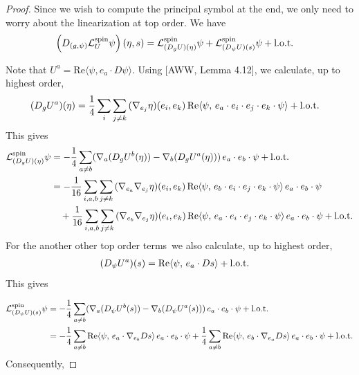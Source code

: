 \documentclass{amsart}
\theoremstyle{definition}
\theoremstyle{remark}
\numberwithin{equation}{section}
\newcommand{\lot}{\textup{l.o.t.}}
\begin{document}
\begin{proof}
	Since we wish to compute the principal symbol at the end, we only need to worry about the linearization at top order.	We have
	\begin{align}
		\left(D_{(g,\psi)}\mathcal{L}_{U}^{\text{spin}}\psi\right)(\eta,s) & = \mathcal{L}_{(D_g U)(\eta)}^{\text{spin}}\psi  + \mathcal{L}_{(D_\psi U)(s)}^{\text{spin}}\psi + \lot
	\end{align}
	
	Note that $U^a = \text{Re}\langle\psi, e_a\cdot D\psi\rangle $. 
	Using [AWW, Lemma 4.12], we calculate, up to highest order, 
	\begin{align}
		(D_g U^a)(\eta) &= \frac{1}{4}\sum_{i}\sum_{j\neq k}\, (\nabla_{e_j}\eta)(e_i, e_k)\, \textup{Re}\langle \psi,\, e_a\cdot e_i\cdot e_j\cdot e_k\cdot\psi\rangle  + \lot
	\end{align} 
	This gives
	\begin{equation}
		\begin{aligned}
			\mathcal{L}_{(D_g U)(\eta)}^{\text{spin}}\psi &=  -\frac{1}{4}\sum_{a\neq b}(\nabla_a (D_g U^b(\eta)) - \nabla_b (D_g U^a(\eta)))\, e_a\cdot e_b\cdot \psi + \lot\\
		&= -\frac{1}{16}\sum_{i,a,b}\sum_{j\neq k}\, (\nabla_{e_a}\nabla_{e_j}\eta)(e_i, e_k)\, \textup{Re}\langle \psi,\, e_b\cdot e_i\cdot e_j\cdot e_k\cdot\psi\rangle\, e_a\cdot e_b\cdot \psi\\
		&\quad + \frac{1}{16}\sum_{i,a,b}\sum_{j\neq k}\, (\nabla_{e_b}\nabla_{e_j}\eta)(e_i, e_k)\, \textup{Re}\langle \psi,\, e_a\cdot e_i\cdot e_j\cdot e_k\cdot\psi\rangle\, e_a\cdot e_b\cdot \psi + \lot
		\end{aligned}
	\end{equation}
For the another other top order terms\, we also calculate, up to highest order,
	\begin{align}
		&(D_\psi U^a)(s) = \textup{Re}\langle\psi,\, e_a\cdot Ds\rangle + \lot
	\end{align}
	This gives
	
	\begin{equation}
		\begin{aligned}
			\mathcal{L}_{(D_{\psi} U)(s)}^{\text{spin}}\psi &=  -\frac{1}{4}\sum_{a\neq b}(\nabla_a (D_{\psi} U^b(s)) - \nabla_b (D_{\psi}  U^a(s)))\, e_a\cdot e_b\cdot \psi + \lot\\
			&= -\frac{1}{4}\sum_{a\neq b}\textup{Re}\langle\psi,\, e_a\cdot \nabla_{e_b}Ds\rangle \, e_a\cdot e_b\cdot \psi  + \frac{1}{4}\sum_{a\neq b}\textup{Re}\langle\psi,\, e_b\cdot \nabla_{e_a}Ds\rangle \, e_a\cdot e_b\cdot \psi + \lot\\
		\end{aligned}
	\end{equation}
Consequently,


\end{proof}
\end{document}
